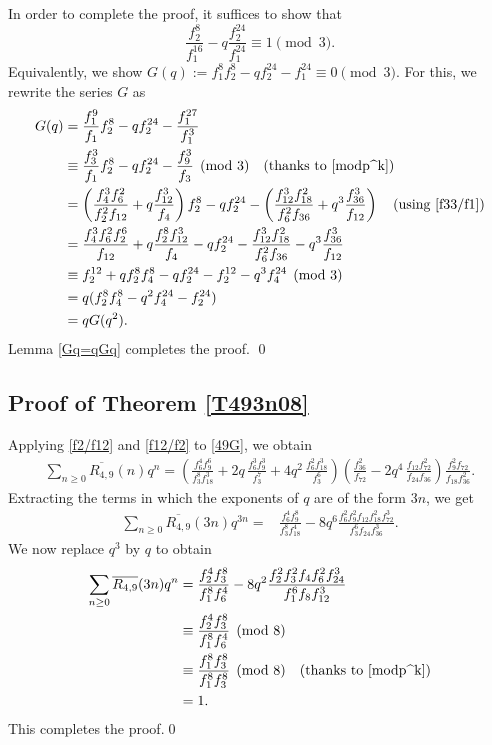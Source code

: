 \documentclass{amsart}
\theoremstyle{definition}
\begin{document}
In order to complete the proof, it suffices to show that 
\begin{equation*}
    \frac{f_2^8}{f_1^{16}}-q\frac{f_2^{24}}{f_1^{24}}\equiv1\pmod{3}.
\end{equation*}
Equivalently, we show $G(q):=f_1^8f_2^8-qf_2^{24}-f_1^{24}\equiv0\pmod{3}$. For this, we rewrite the series $G$ as 
\begin{align*}
   G(q)&=\frac{f_1^9}{f_1}f_2^8-qf_2^{24}-\frac{f_1^{27}}{f_1^3} \\
   &\equiv\frac{f_3^3}{f_1}f_2^8-qf_2^{24}-\frac{f_9^3}{f_3}\pmod{3} \quad \text{(thanks to \eqref{modp^k})}\\
  &=\left(\frac{f_4^3f_6^2}{f_2^2f_{12}}+q\frac{f_{12}^3}{f_4}\right)f_2^8-qf_2^{24}-\left(\frac{f_{12}^3f_{18}^2}{f_{6}^2f_{36}}+q^3\frac{f_{36}^3}{f_{12}}\right) \quad \text{(using \eqref{f33/f1})}\\
  &=\frac{f_4^3f_6^2f_2^6}{f_{12}}+q\frac{f_2^8f_{12}^3}{f_4}-qf_2^{24}-\frac{f_{12}^3f_{18}^2}{f_{6}^2f_{36}}-q^3\frac{f_{36}^3}{f_{12}}\\
  &\equiv f_2^{12}+qf_2^8f_4^8-qf_2^{24}-f_2^{12}-q^3f_4^{24} \pmod{3}\\
  &=q(f_2^8f_4^8-q^2f_4^{24}-f_2^{24})\\
  &=qG(q^2).
\end{align*}
Lemma \ref{Gq=qGq} completes the proof. \qed
\subsection*{Proof of Theorem \ref{T493n08}}

Applying \eqref{f2/f12} and \eqref{f12/f2}
to \eqref{49G}, we obtain
\begin{align}\label{49n}
\sum_{n\ge 0}\overline{R_{4,9}}(n)q^{n} 
	= \left(\frac{f_6^4 f_9^6}{f_3^8 f_{18}^3} + 2q\, \frac{f_6^3 f_9^3}{f_3^7} + 4q^2\, \frac{f_6^2 f_{18}^3}{f_3^6}\right)
	\left(\frac{f_{36}^2}{f_{72}} - 2q^4\, \frac{f_{12} f_{72}^2}{f_{24} f_{36}}\right)
	\frac{f_9^2 f_{72}}{f_{18} f_{36}^2}.
\end{align}
Extracting the terms in which the exponents of $q$ are of the form $3n$, we get 
\begin{align*}
    \sum_{n\geq0}\overline{R_{4,9}}(3n)q^{3n}=& \frac{f_6^4f_9^8}{f_3^8f_{18}^4} - 8q^6 \frac{f_6^2 f_9^2 f_{12} f_{18}^2 f_{72}^3}{f_3^6 f_{24} f_{36}^3}.
\end{align*}
We now replace $q^3$ by $q$ to obtain
\begin{align}
   \label{493n} \sum_{n\geq0}\overline{R_{4,9}}(3n)q^{n}&=\frac{f_2^4 f_3^8}{f_1^8 f_6^4} - 8q^2 \frac{f_2^2 f_3^2 f_4 f_6^2 f_{24}^3}{f_1^6 f_8 f_{12}^3}\\
  \notag & \equiv\frac{f_2^4f_3^8}{f_1^8f_{6}^4}\pmod{8}\\
   \notag &\equiv\frac{f_1^8f_3^8}{f_1^8f_3^8}\pmod{8} \quad \text{(thanks to \eqref{modp^k})}\\
   \notag &=1.
\end{align}
This completes the proof.\qed
\end{document}

